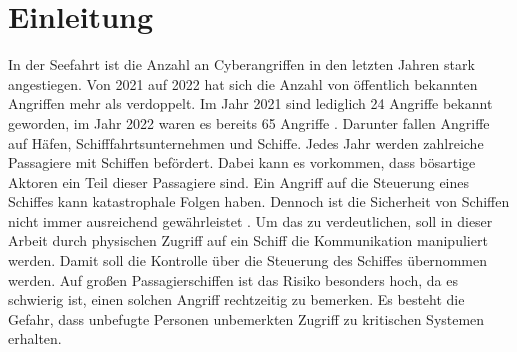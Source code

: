 \chapter{Einleitung}

In der Seefahrt ist die Anzahl an Cyberangriffen in den letzten Jahren stark angestiegen. Von 2021 auf 2022 hat sich die Anzahl von öffentlich
bekannten Angriffen mehr als verdoppelt. Im Jahr 2021 sind lediglich 24 Angriffe bekannt geworden, im Jahr 2022 waren es bereits 65 Angriffe 
\cite{mcad}. Darunter fallen Angriffe auf Häfen, Schifffahrtsunternehmen und Schiffe.
Jedes Jahr werden zahlreiche Passagiere mit Schiffen befördert. Dabei kann es vorkommen, dass bösartige Aktoren ein Teil dieser Passagiere sind.
Ein Angriff auf die Steuerung eines Schiffes kann katastrophale Folgen haben. Dennoch ist die Sicherheit von Schiffen nicht 
immer ausreichend gewährleistet \cite{Reilly2016}.
Um das zu verdeutlichen, soll in dieser Arbeit durch physischen Zugriff auf ein Schiff die Kommunikation manipuliert werden.
Damit soll die Kontrolle über die Steuerung des Schiffes übernommen werden. 
Auf großen Passagierschiffen ist das Risiko besonders hoch, da es
schwierig ist, einen solchen Angriff rechtzeitig zu bemerken. Es besteht die Gefahr, 
dass unbefugte Personen unbemerkten Zugriff zu kritischen Systemen erhalten. \\

